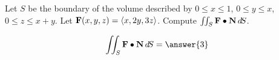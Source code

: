 \documentclass{ximera}
\author{David Guichard \and Neal Koblitz \and H. Jerome Keisler \and Albert Scheller \and Barry Balof \and Mike Wills \and Matthew Carr}
\begin{document}
\begin{exercise}




Let $S$ be the boundary of the volume described by $0\le x\le 1$, $0\le y\le x$, $0\le z\le x+y$. Let $\mathbf{F}(x,y,z)=\left\langle x,2y,3z\right\rangle$. Compute $\iint_{S}\mathbf{F}\bullet\mathbf{N}\mathop{}\!d\! S$.

\begin{prompt}
\[
\iint_{S}\vec{F}\dotp\vec{N}\d S=\answer{3}
\]
\end{prompt}


\end{exercise}
\end{document}
